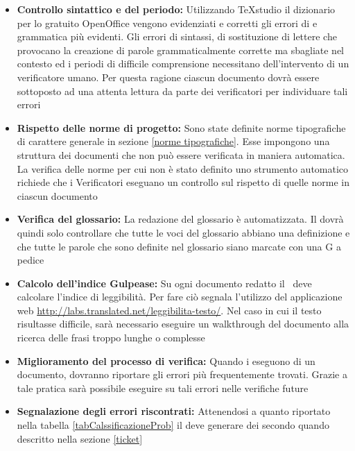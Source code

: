 \documentclass[12pt,a4paper]{article}
\begin{document}
\begin{itemize}
	\item \textbf{Controllo sintattico e del periodo:} Utilizzando TeXstudio il dizionario per lo  gratuito OpenOffice vengono evidenziati e corretti gli errori di  e grammatica più evidenti. Gli errori di sintassi, di sostituzione di lettere che provocano la creazione di parole grammaticalmente corrette ma sbagliate nel contesto ed i periodi di difficile comprensione necessitano dell'intervento di un verificatore umano. Per questa ragione ciascun documento dovrà essere sottoposto ad una attenta lettura da parte dei verificatori per individuare tali errori
	\item \textbf{Rispetto delle norme di progetto:} Sono state definite norme tipografiche di carattere generale in \NdP{} sezione \ref{norme tipografiche}. Esse impongono una struttura dei documenti che non può essere verificata in maniera automatica. La verifica delle norme per cui non è stato definito uno strumento automatico richiede che i Verificatori eseguano un controllo sul rispetto di quelle norme in ciascun documento
	\item \textbf{Verifica del glossario:} La redazione del glossario è automatizzata. Il \VR{} dovrà quindi solo controllare che tutte le voci del glossario abbiano una definizione e che tutte le parole che sono definite nel glossario siano marcate con una G a pedice 
	\item \textbf{Calcolo dell’indice Gulpease:} Su ogni documento redatto il \VR\ deve calcolare l’indice di leggibilità. Per fare ciò segnala l'utilizzo del applicazione web \url{http://labs.translated.net/leggibilita-testo/}. Nel caso in cui il testo risultasse difficile, sarà necessario eseguire un walkthrough del documento alla ricerca delle frasi troppo lunghe o complesse
	\item \textbf{Miglioramento del processo di verifica:} Quando i \VRpl{} eseguono  di un documento, dovranno riportare gli errori più frequentemente trovati. Grazie a tale pratica sarà possibile eseguire  su tali errori nelle verifiche future
	\item \textbf{Segnalazione degli errori riscontrati:} Attenendosi a quanto riportato nella tabella \ref{tabCalssificazioneProb} il \VR{} deve generare dei  secondo quando descritto nella sezione \ref{ticket}
\end{itemize}
\end{document}
